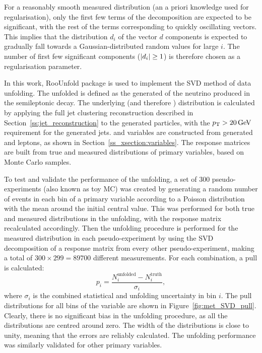 For a reasonably smooth measured distribution (an a priori knowledge used for regularisation), only the first few terms
of the decomposition are expected to be significant, with the rest of the terms corresponding to quickly oscillating
vectors. This implies that the distribution $d_i$ of the vector $d$ components is expected to gradually fall towards
a Gaussian-distributed random values for large $i$. The number of first few significant components ($\lvert d_i \rvert \geq 1$)
is therefore chosen as a regularisation parameter.

In this work, RooUnfold package \autocite{RooUnfold} is used to implement the SVD method of data unfolding. The unfolded
\MET is defined as the generated \pt of the neutrino produced in the semileptonic \ttbar decay. The underlying \HT (and
therefore \ST) distribution is calculated by applying the full jet clustering reconstruction described in
Section~\ref{ss:jet_reconstruction} to the generated particles, with the $\pt > \SI{20}{\GeV}$ requirement for the
generated jets. \MT and \WPT variables are constructed from generated \MET and leptons, as shown in
Section~\ref{ss_xsection:variables}. The response matrices are built from true and measured distributions of primary
variables, based on \ttbar Monte Carlo samples.

To test and validate the performance of the unfolding, a set of 300 pseudo-experiments (also known as toy MC) was
created by generating a random number of events in each bin of a primary variable according to a Poisson distribution
with the mean around the initial central value. This was performed for both true and measured distributions in the
unfolding, with the response matrix recalculated accordingly. Then the unfolding procedure is performed for the
measured distribution in each pseudo-experiment by using the SVD decomposition of a response matrix from every other
pseudo-experiment, making a total of $300 \times 299 = 89700$ different measurements. For each combination, a pull
is calculated:
\begin{equation}
p_i = \frac{N_i^{\text{unfolded}} -N_i^{\text{truth}} }{\sigma_i},
\end{equation}
where $\sigma_i$ is the combined statistical and unfolding uncertainty in bin $i$. The pull distributions for all bins
of the \MET variable are shown in Figure~\ref{fig:met_SVD_pull}. Clearly, there is no significant bias in the unfolding
procedure, as all the distributions are centred around zero. The width of the distributions is close to unity, meaning
that the errors are reliably calculated. The unfolding performance was similarly validated for other primary variables.

